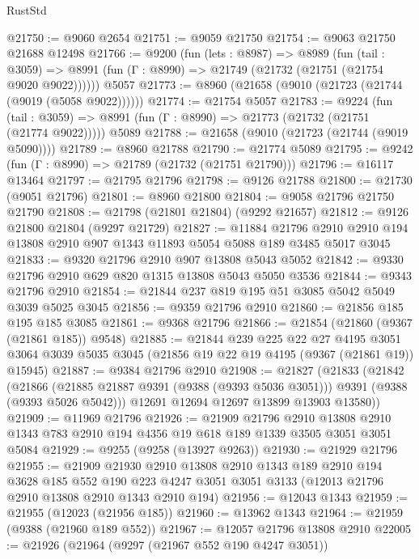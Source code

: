 \begin{lexlean}{RustStd}
\begin{coremodule}
@21750 := @9060 @2654
@21751 := @9059 @21750
@21754 := @9063 @21750 @21688 @12498
@21766 := @9200
    (fun (lets : @8987) =>
    @8989
      (fun (tail : @3059) =>
      @8991 (fun (Γ : @8990) => @21749 (@21732 (@21751 (@21754 @9020 @9022))))))
    @5057
@21773 := @8960 (@21658 (@9010 (@21723 (@21744 (@9019 (@5058 @9022))))))
@21774 := @21754 @5057
@21783 := @9224
    (fun (tail : @3059) => @8991 (fun (Γ : @8990) => @21773 (@21732 (@21751 (@21774 @9022)))))
    @5089
@21788 := @21658 (@9010 (@21723 (@21744 (@9019 @5090))))
@21789 := @8960 @21788
@21790 := @21774 @5089
@21795 := @9242 (fun (Γ : @8990) => @21789 (@21732 (@21751 @21790)))
@21796 := @16117 @13464
@21797 := @21795 @21796
@21798 := @9126 @21788
@21800 := @21730 (@9051 @21796)
@21801 := @8960 @21800
@21804 := @9058 @21796 @21750 @21790
@21808 := @21798 (@21801 @21804) (@9292 @21657)
@21812 := @9126 @21800 @21804 (@9297 @21729)
@21827 := @11884
    @21796
    @2910
    @2910
    @194
    @13808
    @2910
    @907
    @1343
    @11893
    @5054
    @5088
    @189
    @3485
    @5017
    @3045
@21833 := @9320 @21796 @2910 @907 @13808 @5043 @5052
@21842 := @9330 @21796 @2910 @629 @820 @1315 @13808 @5043 @5050 @3536
@21844 := @9343 @21796 @2910
@21854 := @21844 @237 @819 @195 @51 @3085 @5042 @5049 @3039 @5025 @3045
@21856 := @9359 @21796 @2910
@21860 := @21856 @185 @195 @185 @3085
@21861 := @9368 @21796
@21866 := @21854 (@21860 (@9367 (@21861 @185)) @9548)
@21885 := @21844
    @239
    @225
    @22
    @27
    @4195
    @3051
    @3064
    @3039
    @5035
    @3045
    (@21856 @19 @22 @19 @4195 (@9367 (@21861 @19)) @15945)
@21887 := @9384 @21796 @2910
@21908 := @21827
    (@21833
      (@21842
        (@21866 (@21885 @21887 @9391 (@9388 (@9393 @5036 @3051))) @9391 (@9388 (@9393 @5026 @5042)))
        @12691
        @12694
        @12697
        @13899
        @13903
        @13580))
@21909 := @11969 @21796
@21926 := @21909
    @21796
    @2910
    @13808
    @2910
    @1343
    @783
    @2910
    @194
    @4356
    @19
    @618
    @189
    @1339
    @3505
    @3051
    @3051
    @5084
@21929 := @9255 (@9258 (@13927 @9263))
@21930 := @21929 @21796
@21955 := @21909
    @21930
    @2910
    @13808
    @2910
    @1343
    @189
    @2910
    @194
    @3628
    @185
    @552
    @190
    @223
    @4247
    @3051
    @3051
    @3133
    (@12013 @21796 @2910 @13808 @2910 @1343 @2910 @194)
@21956 := @12043 @1343
@21959 := @21955 (@12023 (@21956 @185))
@21960 := @13962 @1343
@21964 := @21959 (@9388 (@21960 @189 @552))
@21967 := @12057 @21796 @13808 @2910
@22005 := @21926
    (@21964
      (@9297 (@21967 @552 @190 @4247 @3051))

\end{coremodule}
\end{lexlean}
